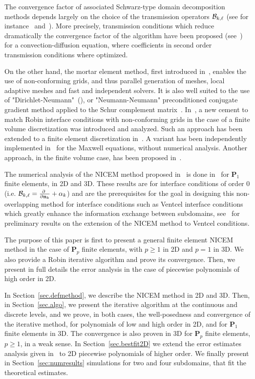 \documentclass[final]{siamltex}
\begin{document}
The convergence factor of associated Schwarz-type domain decomposition
methods depends largely on the choice of the transmission operators ${\cal B}_{k,\ell}$
(see for instance~\cite{Hagstrom,Nataf.4,GHAD2,GHAD1,Despres.3,Despres.4,Douglas,BenDespres,Widlund,Keyes,Bourdonnaye}
and~\cite{Nataf,Quarteroni}).
More precisely, transmission conditions which
reduce dramatically the convergence factor
of the algorithm have been proposed (see~\cite{Japhet2,Japhet1,JNR}) for a convection-diffusion equation,
where coefficients in second order transmission conditions where optimized. 

On the other hand, the mortar element method,
first introduced in~\cite{BMP}, enables the use of non-conforming
grids, and thus parallel generation of meshes, local adaptive
meshes and fast and independent solvers.
It is also well suited to the use of 
"Dirichlet-Neumann"~(\cite{Quarteroni}), or "Neumann-Neumann"
preconditioned conjugate gradient method applied to the Schur
complement matrix~\cite{Lacour,AMW,TosWid}.  
In~\cite{AJMN}, a new cement to match Robin interface conditions with non-conforming
grids in the case of a finite volume discretization was introduced and analyzed.
Such an approach has been extended
to a finite element discretization in~\cite{GJMN}. A variant has been
independently implemented in~\cite{Vouvakis} for the Maxwell equations,
without numerical analysis. Another approach, in the finite volume case, has been proposed in~\cite{Saas}.

The numerical analysis of the NICEM method proposed in~\cite{GJMN}
is done in~\cite{JMN10} for ${\mathbf{P}}_1$ finite elements, in 2D and 3D.
These results are for interface conditions of order 0 (i.e. ${\cal B}_{k,\ell}={\partial\ \over \partial {{\bf n}}_k}+\alpha_k$)
and are the prerequisites for the goal in designing this non-overlapping method for
interface conditions such as Ventcel interface
conditions which greatly enhance the information exchange between subdomains, see~\cite{JMN12} for preliminary results on the extension
of the NICEM method to Ventcel conditions.

The purpose of this paper is first to present a general finite element NICEM method in the case of ${\mathbf{P}}_p$ finite elements, with $p\ge 1$ in 2D and $p=1$ in 3D. We also provide a Robin iterative algorithm and prove its convergence. Then,
we present in full details the error analysis in the case of piecewise polynomials of high order in 2D.

In Section~\ref{sec.defmethod}, we describe the NICEM method in 2D and 3D.
Then, in Section~\ref{sec.algo}, we present the iterative algorithm at the continuous and discrete levels,
and we prove, in both cases, the well-posedness and convergence of the iterative method,
for polynomials of low and high order in 2D, and for ${\mathbf{P}}_1$ finite elements in 3D.
The convergence is also proven in 3D for ${\mathbf{P}}_p$ finite elements, $p\ge 1$,
in a weak sense. In Section~\ref{sec.bestfit2D}  we extend
the error estimates analysis given in~\cite{JMN10} to 2D piecewise polynomials of higher order.
We finally present in Section~\ref{sec:numresults} simulations for two and four
subdomains, that fit the theoretical estimates.
\end{document}
